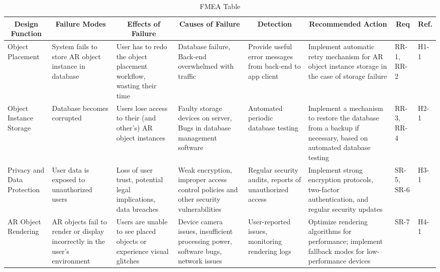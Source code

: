 \documentclass{article}
\begin{document}
\begin{landscape}
\begin{table}[hp]
    \caption{FMEA Table} \label{FMEA}
    \centering
    \begin{footnotesize}
    \begin{tabular}{|p{1in}|p{1in}|p{1.5in}|p{1.5in}|p{1.5in}|p{2in}|p{0.4in}|p{0.4in}|}
        \hline
        \multicolumn{1}{|c|}{\textbf{Design Function}} & \multicolumn{1}{c|}{\textbf{Failure Modes}} & \multicolumn{1}{c|}{\textbf{Effects of Failure}} & \multicolumn{1}{c|}{\textbf{Causes of Failure}} & \multicolumn{1}{|c|}{\textbf{Detection}} & \multicolumn{1}{c|}{\textbf{Recommended Action}} & \multicolumn{1}{c|}{\textbf{Req}} & \multicolumn{1}{c|}{\textbf{Ref.}} \\
        \hline
        Object Placement & System fails to store AR object instance in database & User has to redo the object placement workflow, wasting their time & Database failure, Back-end overwhelmed with traffic & Provide useful error messages from back-end to app client & Implement automatic retry mechanism for AR object instance storage in the case of storage failure & RR-1, RR-2 & H1-1\\
        \hline
        Object Instance Storage & Database becomes corrupted & Users lose access to their (and other's) AR object instances & Faulty storage devices on server, Bugs in database management software & Automated periodic database testing & Implement a mechanism to restore the database from a backup if necessary, based on automated database testing & RR-3, RR-4 & H2-1 \\
        \hline
        Privacy and Data Protection & User data is exposed to unauthorized users & Loss of user trust, potential legal implications, data breaches & Weak encryption, improper access control policies and other security vulnerabilities & Regular security audits, reports of unauthorized access & Implement strong encryption protocols, two-factor authentication, and regular security updates & SR-5, SR-6 & H3-1 \\
        \hline
        AR Object Rendering &  AR objects fail to render or display incorrectly in the user’s environment & Users are unable to see placed objects or experience visual glitches & Device camera issues, insufficient processing power, software bugs, network issues & User-reported issues, monitoring rendering logs & Optimize rendering algorithms for performance; implement fallback modes for low-performance devices & SR-7 & H4-1 \\
        \hline
    \end{tabular}
    \end{footnotesize}
\end{table}
\end{landscape}
\restoregeometry
\end{document}
